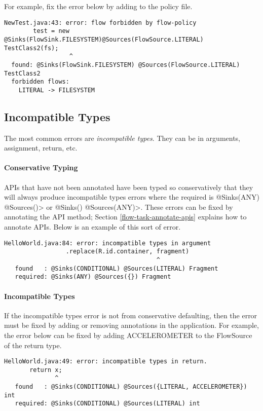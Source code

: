For example, fix the error below by adding  to the policy file.
\begin{Verbatim}
NewTest.java:43: error: flow forbidden by flow-policy  
        test = new @Sinks(FlowSink.FILESYSTEM)@Sources(FlowSource.LITERAL) TestClass2(fs);
                  ^
  found: @Sinks(FlowSink.FILESYSTEM) @Sources(FlowSource.LITERAL) TestClass2 
  forbidden flows:
    LITERAL -> FILESYSTEM
\end{Verbatim}

\subsection{Incompatible Types}
The most common errors are \emph{incompatible types}.  They can be in arguments,  assignment, return, etc.

\paragraph{Conservative Typing}

APIs that have not been annotated have been typed so conservatively that they will always produce incompatible types errors where the required is \<@Sinks(ANY) @Sources({})> or 
\<@Sinks({}) @Sources(ANY)>.  These errors can be fixed by annotating the API method; 
Section \ref{flow-task-annotate-apis} explains how to annotate APIs. 
Below is an example of this sort of error.

\begin{Verbatim}
HelloWorld.java:84: error: incompatible types in argument
                 .replace(R.id.container, fragment)
                                          ^
   found   : @Sinks(CONDITIONAL) @Sources(LITERAL) Fragment
   required: @Sinks(ANY) @Sources({}) Fragment
\end{Verbatim}

\paragraph{Incompatible Types}

If the incompatible types error is not from conservative defaulting, then the error must be fixed by adding or
removing annotations in the application.  For example, the error below can be fixed by adding ACCELEROMETER to the FlowSource of the return type.  

\begin{Verbatim}
HelloWorld.java:49: error: incompatible types in return.
       return x;
              ^
   found   : @Sinks(CONDITIONAL) @Sources({LITERAL, ACCELEROMETER}) int
   required: @Sinks(CONDITIONAL) @Sources(LITERAL) int
\end{Verbatim}

